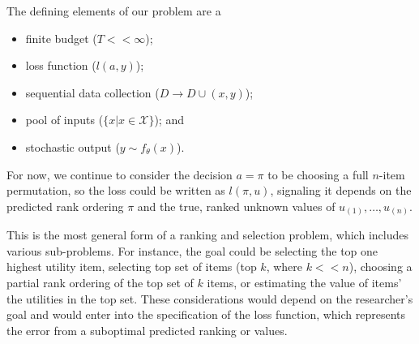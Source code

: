 \documentclass[nonblindrev]{informs3}
\newcommand{\numitems}{n}
\newcommand{\numtopset}{k}
\begin{document}
The defining elements of our problem are a
\begin{itemize}
	\item finite budget ($T << \infty$);
	\item loss function ($l(a,y)$);
	\item sequential data collection ($D \to D \cup (x,y)$);
	\item pool of inputs ($\{ x | x \in \mathcal{X} \}$); and
	\item stochastic output ($y \sim f_{\theta}(x)$).
\end{itemize}
For now, we continue to consider the decision $a=\pi$ to be choosing a full $\numitems$-item permutation, so the loss could be written as $l(\pi,u)$, signaling it depends on the predicted rank ordering $\pi$ and the true, ranked unknown values of $u_{(1)},\ldots,u_{(\numitems)}$. 

This is the most general form of a ranking and selection problem, which includes various sub-problems. For instance, the goal could be selecting the top one highest utility item, selecting top set of items (top $\numtopset$, where $\numtopset << \numitems$), choosing a partial rank ordering of the top set of $\numtopset$ items, or estimating the value of items' the utilities in the top set. These considerations would depend on the researcher's goal and would enter into the specification of the loss function, which represents the error from a suboptimal predicted ranking or values. 



\end{document}
